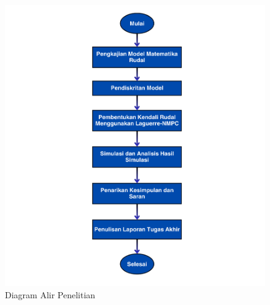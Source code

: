 \begin{figure}[htbp]
    \centering
    \includegraphics[width=\linewidth]{foto/Diagram Alir Penelitian Blue.png}
    \caption{Diagram Alir Penelitian}
    \label{fig:diagram penelitian}
\end{figure}

\pagebreak
